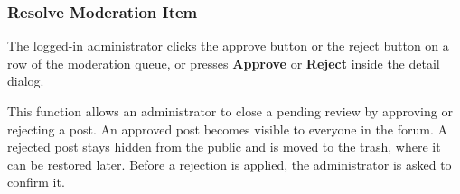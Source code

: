 \subsubsection{Resolve Moderation Item}

 The logged-in administrator clicks the approve button or the reject button on a row of the moderation queue, or presses \textbf{Approve} or \textbf{Reject} inside the detail dialog.

 This function allows an administrator to close a pending review by approving or rejecting a post. An approved post becomes visible to everyone in the forum. A rejected post stays hidden from the public and is moved to the trash, where it can be restored later. Before a rejection is applied, the administrator is asked to confirm it.


